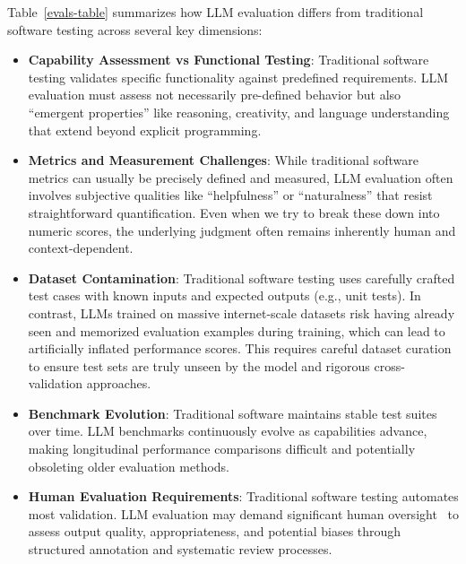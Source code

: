 Table~\ref{evals-table} summarizes how LLM evaluation differs from traditional software testing across several key dimensions:
\begin{itemize}
    \item \textbf{Capability Assessment vs Functional Testing}: Traditional software testing validates specific functionality against predefined requirements. LLM evaluation must assess not necessarily pre-defined behavior but also ``emergent properties'' like reasoning, creativity, and language understanding that extend beyond explicit programming.

    \item \textbf{Metrics and Measurement Challenges}: While traditional software metrics can usually be precisely defined and measured, LLM evaluation often involves subjective qualities like ``helpfulness'' or ``naturalness'' that resist straightforward quantification. Even when we try to break these down into numeric scores, the underlying judgment often remains inherently human and context-dependent.

    \item \textbf{Dataset Contamination}: Traditional software testing uses carefully crafted test cases with known inputs and expected outputs (e.g., unit tests). In contrast, LLMs trained on massive internet-scale datasets risk having already seen and memorized evaluation examples during training, which can lead to artificially inflated performance scores. This requires careful dataset curation to ensure test sets are truly unseen by the model and rigorous cross-validation approaches.

    \item \textbf{Benchmark Evolution}: Traditional software maintains stable test suites over time. LLM benchmarks continuously evolve as capabilities advance, making longitudinal performance comparisons difficult and potentially obsoleting older evaluation methods.

    \item \textbf{Human Evaluation Requirements}: Traditional software testing automates most validation. LLM evaluation may demand significant human oversight~ to assess output quality, appropriateness, and potential biases through structured annotation and systematic review processes.
\end{itemize}


